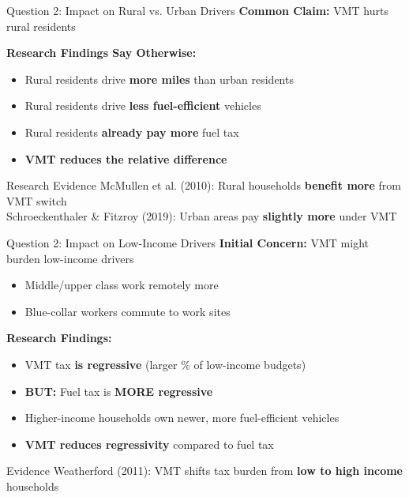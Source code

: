 \documentclass[aspectratio=169]{beamer}
\begin{document}
\begin{frame}{Question 2: Impact on Rural vs. Urban Drivers}
\textbf{Common Claim:} VMT hurts rural residents

\vspace{0.5cm}
\textbf{Research Findings Say Otherwise:}
\begin{itemize}
\item Rural residents drive \textbf{more miles} than urban residents
\item Rural residents drive \textbf{less fuel-efficient} vehicles
\item Rural residents \textbf{already pay more} fuel tax
\item \textbf{VMT reduces the relative difference}
\end{itemize}

\vspace{0.5cm}
\begin{block}{Research Evidence}
McMullen et al. (2010): Rural households \textbf{benefit more} from VMT switch\\
Schroeckenthaler \& Fitzroy (2019): Urban areas pay \textbf{slightly more} under VMT
\end{block}
\end{frame}

\begin{frame}{Question 2: Impact on Low-Income Drivers}
\textbf{Initial Concern:} VMT might burden low-income drivers
\begin{itemize}
\item Middle/upper class work remotely more
\item Blue-collar workers commute to work sites
\end{itemize}

\vspace{0.5cm}
\textbf{Research Findings:}
\begin{itemize}
\item VMT tax \textbf{is regressive} (larger \% of low-income budgets)
\item \textbf{BUT:} Fuel tax is \textbf{MORE regressive}
\item Higher-income households own newer, more fuel-efficient vehicles
\item \textbf{VMT reduces regressivity} compared to fuel tax
\end{itemize}

\vspace{0.3cm}
\begin{block}{Evidence}
Weatherford (2011): VMT shifts tax burden from \textbf{low to high income} households
\end{block}
\end{frame}
\end{document}
